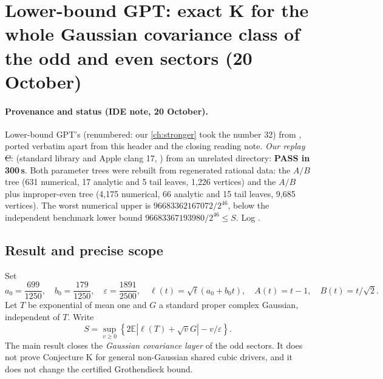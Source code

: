 \section{Lower-bound GPT: exact K for the whole Gaussian covariance class of the odd and even sectors (20 October)}
\label{ch:polarized-profile-certificate}

\paragraph{Provenance and status (IDE note, 20 October).} Lower-bound GPT's  (renumbered: our \autoref{ch:stronger} took the number 32) from
, ported verbatim apart from this header and the closing reading note. \emph{Our replay} \st{C}:  (standard library
and Apple clang 17, ) from an unrelated directory: \textbf{PASS in 300\,s}. Both parameter trees were rebuilt from regenerated rational data: the $A/B$ tree (631
numerical, 17 analytic and 5 tail leaves, 1{,}226 vertices) and the $A/B$ plus improper-even tree (4{,}175 numerical, 66 analytic and 15 tail leaves, 9{,}685 vertices). The worst numerical
upper is $96683362167072/2^{46}$, below the independent benchmark lower bound $96683367193980/2^{46}\le S$. Log .

\providecommand{\eps}{\varepsilon}
\providecommand{\E}{\mathbb E}
\subsection{Result and precise scope}
Set
\[
 a_0=\frac{699}{1250},\quad b_0=\frac{179}{1250},\quad
 \eps=\frac{1891}{2500},\quad
 \ell(t)=\sqrt t(a_0+b_0t),\quad A(t)=t-1,\quad B(t)=t/\sqrt2.
\]
Let $T$ be exponential of mean one and $G$ a standard proper complex
Gaussian, independent of $T$. Write
\[
 S=\sup_{v\ge0}\left\{2\E|\ell(T)+\sqrt vG|-v/\eps\right\}.
\]
The main result closes the \emph{Gaussian covariance layer} of the odd
sectors. It does not prove Conjecture K for general non-Gaussian shared
cubic drivers, and it does not change the certified Grothendieck bound.

